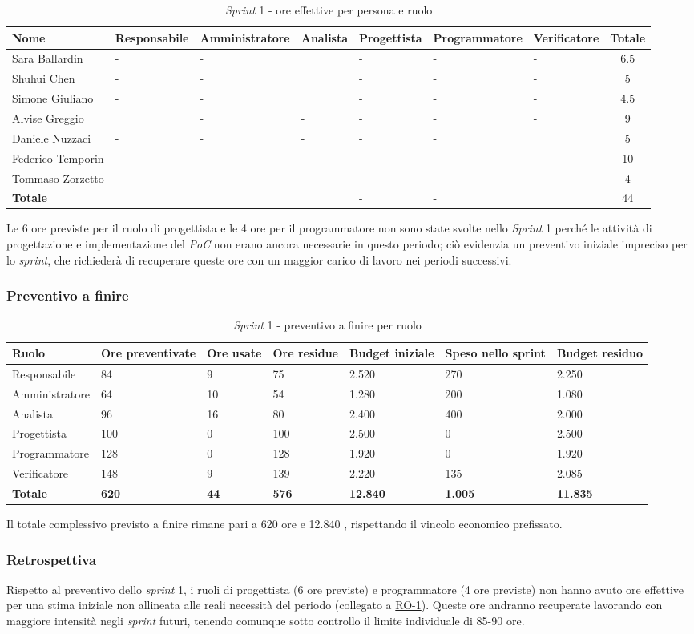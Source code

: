 \documentclass[11pt, a4paper]{article}
\newcommand{\rigaore}[8]{#1 & #2 & #3 & #4 & #5 & #6 & #7 & #8 \\ \hline}
\newcommand{\tabellaore}[3]{%
	\begin{table}[H]
		\centering
		\renewcommand{\arraystretch}{1.3}\small
		\setlength{\tabcolsep}{3pt}
		\setlength{\arrayrulewidth}{0.8pt}
		{\arrayrulecolor{gray!50}
			\begin{tabular}{|l|>{\centering\arraybackslash}p{1.65cm}|>{\centering\arraybackslash}p{1.65cm}|>{\centering\arraybackslash}p{1.65cm}|>{\centering\arraybackslash}p{1.65cm}|>{\centering\arraybackslash}p{1.65cm}|>{\centering\arraybackslash}p{1.65cm}|c|}
				\hline
				\rowcolor{gray!10}
				\textbf{Nome} &
				\hspace{0pt}\textbf{Responsabile} &
				\hspace{0pt}\textbf{Amministratore} &
				\hspace{0pt}\textbf{Analista} &
				\hspace{0pt}\textbf{Progettista} &
				\hspace{0pt}\textbf{Programmatore} &
				\hspace{0pt}\textbf{Verificatore} &
				\textbf{Totale} \\ \hline
				#3
		\end{tabular}}
		\caption{#1}\label{#2}
	\end{table}
}
\newcommand{\rigapaf}[7]{#1 & #2 & #3 & #4 & #5 & #6 & #7 \\ \hline}
\newcommand{\tabellapaf}[3]{%
	\begin{table}[H]
		\centering
		\renewcommand{\arraystretch}{1.4}\small
		\setlength{\arrayrulewidth}{0.8pt}
		\newcolumntype{C}{>{\centering\arraybackslash}X}
		{\arrayrulecolor{gray!50}
			\begin{tabularx}{\textwidth}{|l|C|C|C|C|C|C|}
				\hline
				\rowcolor{gray!10}
				\textbf{Ruolo} &
				\textbf{Ore preventivate} &
				\textbf{Ore usate} &
				\textbf{Ore residue} &
				\textbf{Budget iniziale} &
				\textbf{Speso nello sprint} &
				\textbf{Budget residuo} \\ \hline
				#3
		\end{tabularx}}
		\caption{#1}\label{#2}
	\end{table}
}
\begin{document}
	\tabellaore{\textit{Sprint} 1 - ore effettive per persona e ruolo}{tab:s1-eff}{
		\rigaore{Sara Ballardin}{-}{-}{6.5}{-}{-}{-}{6.5}
		\rigaore{Shuhui Chen}{-}{-}{5}{-}{-}{-}{5}
		\rigaore{Simone Giuliano}{-}{-}{4.5}{-}{-}{-}{4.5}
		\rigaore{Alvise Greggio}{9}{-}{-}{-}{-}{-}{9}
		\rigaore{Daniele Nuzzaci}{-}{-}{-}{-}{-}{5}{5}
		\rigaore{Federico Temporin}{-}{10}{-}{-}{-}{-}{10}
		\rigaore{Tommaso Zorzetto}{-}{-}{-}{-}{-}{4}{4}
		\rowcolor{gray!10} \rigaore{\textbf{Totale}}{9}{10}{16}{-}{-}{9}{44}
	}
	
	Le 6 ore previste per il ruolo di progettista e le 4 ore per il programmatore non sono state svolte nello \textit{Sprint} 1 perché le attività di progettazione e implementazione del \textit{PoC} non erano ancora necessarie in questo periodo; ciò evidenzia un preventivo iniziale impreciso per lo \textit{sprint}, che richiederà di recuperare queste ore con un maggior carico di lavoro nei periodi successivi.
	
	\subsubsection{Preventivo a finire}
	\tabellapaf{\textit{Sprint} 1 - preventivo a finire per ruolo}{tab:s1-paf}{
		\rigapaf{Responsabile}{84}{9}{75}{2.520 \texteuro}{270 \texteuro}{2.250 \texteuro}
		\rigapaf{Amministratore}{64}{10}{54}{1.280 \texteuro}{200 \texteuro}{1.080 \texteuro}
		\rigapaf{Analista}{96}{16}{80}{2.400 \texteuro}{400 \texteuro}{2.000 \texteuro}
		\rigapaf{Progettista}{100}{0}{100}{2.500 \texteuro}{0 \texteuro}{2.500 \texteuro}
		\rigapaf{Programmatore}{128}{0}{128}{1.920 \texteuro}{0 \texteuro}{1.920 \texteuro}
		\rigapaf{Verificatore}{148}{9}{139}{2.220 \texteuro}{135 \texteuro}{2.085 \texteuro}
		\rowcolor{gray!10}
		\rigapaf{\textbf{Totale}}{\textbf{620}}{\textbf{44}}{\textbf{576}}{\textbf{12.840 \texteuro}}{\textbf{1.005 \texteuro}}{\textbf{11.835 \texteuro}}
	}
	
	Il totale complessivo previsto a finire rimane pari a 620 ore e 12.840 \texteuro, rispettando il vincolo economico prefissato.
	
	
	\subsubsection{Retrospettiva}
	Rispetto al preventivo dello \textit{sprint} 1, i ruoli di progettista (6 ore previste) e programmatore (4 ore previste) non hanno avuto ore effettive per una stima iniziale non allineata alle reali necessità del periodo (collegato a \hyperref[risk:RO-1]{RO-1}). Queste ore andranno recuperate lavorando con maggiore intensità negli \textit{sprint} futuri, tenendo comunque sotto controllo il limite individuale di 85-90 ore.
	
\end{document}
